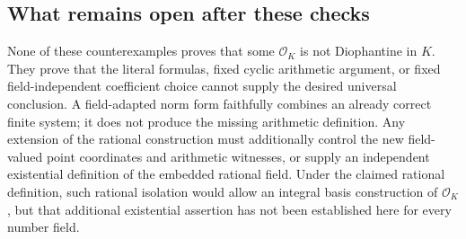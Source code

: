 \subsection{What remains open after these checks}

None of these counterexamples proves that some
$\mathcal O_K$ is not Diophantine in $K$.  They prove that
the literal formulas, fixed cyclic arithmetic argument,
or fixed field-independent coefficient choice cannot supply
the desired universal conclusion.  A field-adapted norm form
faithfully combines an already correct finite system; it
does not produce the missing arithmetic definition.
Any extension of the rational construction must additionally
control the new field-valued point coordinates and arithmetic
witnesses, or supply an independent existential definition
of the embedded rational field.  Under the claimed rational
definition, such rational isolation would allow an integral
basis construction of $\mathcal O_K$, but that additional
existential assertion has not been established here for
every number field.
